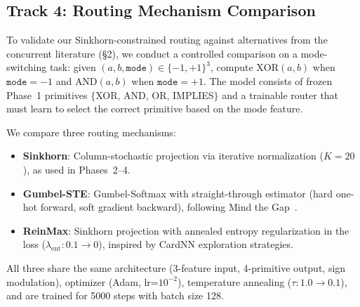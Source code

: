 \documentclass[Royal,times,sageh]{sagej}
\begin{document}
\subsection{Track 4: Routing Mechanism Comparison}
\label{sec:routing_comparison}

To validate our Sinkhorn-constrained routing against alternatives from the concurrent literature (\S2), we conduct a controlled comparison on a mode-switching task: given $(a, b, \texttt{mode}) \in \{-1,+1\}^3$, compute $\text{XOR}(a,b)$ when $\texttt{mode}=-1$ and $\text{AND}(a,b)$ when $\texttt{mode}=+1$. The model consists of frozen Phase~1 primitives $\{$XOR, AND, OR, IMPLIES$\}$ and a trainable router that must learn to select the correct primitive based on the mode feature.

We compare three routing mechanisms:
\begin{itemize}
    \item \textbf{Sinkhorn}: Column-stochastic projection via iterative normalization ($K=20$), as used in Phases~2--4.
    \item \textbf{Gumbel-STE}: Gumbel-Softmax with straight-through estimator (hard one-hot forward, soft gradient backward), following Mind the Gap~\cite{yousefi2025gap}.
    \item \textbf{ReinMax}: Sinkhorn projection with annealed entropy regularization in the loss ($\lambda_{\text{ent}}: 0.1 \to 0$), inspired by CardNN exploration strategies.
\end{itemize}

All three share the same architecture (3-feature input, 4-primitive output, sign modulation), optimizer (Adam, lr=$10^{-2}$), temperature annealing ($\tau: 1.0 \to 0.1$), and are trained for 5000 steps with batch size 128.

\begin{table}[h]
\centering
\caption{Routing Mechanism Comparison on Mode-Switching Task ($n=2$, 4 frozen primitives). Sinkhorn achieves the best accuracy--interpretability tradeoff. Gumbel-STE exhibits the discretization gap discussed in \cite{yousefi2025gap}: hard routing commits early but cannot escape suboptimal assignments.}
\label{tab:routing_comparison}
\small
{}
\end{table}
\end{document}
